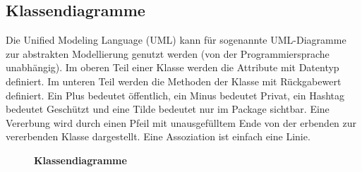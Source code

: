 \subsection{Klassendiagramme}

Die Unified Modeling Language (UML) kann für sogenannte UML-Diagramme zur abstrakten
Modellierung genutzt werden (von der Programmiersprache unabhängig).
Im oberen Teil einer Klasse werden die Attribute mit Datentyp definiert.
Im unteren Teil werden die Methoden der Klasse mit Rückgabewert definiert.
Ein Plus bedeutet öffentlich, ein Minus bedeutet Privat, ein Hashtag
bedeutet Geschützt und eine Tilde bedeutet nur im Package sichtbar.
Eine Vererbung wird durch einen Pfeil mit unausgefülltem Ende von der erbenden
zur vererbenden Klasse dargestellt. Eine Assoziation ist einfach eine Linie.

\vspace*{0.5cm}
\begin{figure}[H]
\begin{center}
    \caption{\textbf{Klassendiagramme}}
\end{center}
\end{figure}

